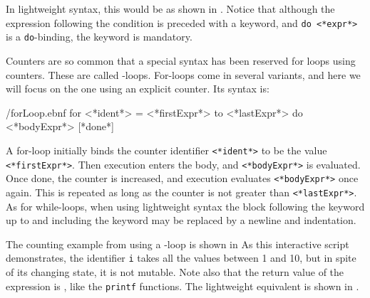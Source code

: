 In lightweight syntax, this would be as shown in .
%
%
Notice that although the expression following the condition is preceded with a  keyword, and \lstinline[language=syntax]{do <*expr*>} is a \lstinline{do}-binding, the keyword  is mandatory. 

Counters are so common that a special syntax has been reserved for loops using counters. These are called -loops. For-loops come in several variants, and here we will focus on the one using an explicit counter. Its syntax is:
%
\begin{verbatimwrite}{\ebnf/forLoop.ebnf}
for <*ident*> = <*firstExpr*> to <*lastExpr*> do <*bodyExpr*> [*done*]
\end{verbatimwrite}
%
A for-loop initially binds the counter identifier \lstinline[language=syntax]{<*ident*>} to be the value \lstinline[language=syntax]{<*firstExpr*>}. Then execution enters the body, and \lstinline[language=syntax]{<*bodyExpr*>} is evaluated. Once done, the counter is increased, and execution evaluates \lstinline[language=syntax]{<*bodyExpr*>}  once again. This is repeated as long as the counter is not greater than \lstinline[language=syntax]{<*lastExpr*>}. As for while-loops, when using lightweight syntax the block following the  keyword up to and including the  keyword may be replaced by a newline and indentation.

The counting example from  using a -loop is shown in 
%
%
As this interactive script demonstrates, the identifier \lstinline!i! takes all the values between 1 and 10, but in spite of its changing state, it is not mutable. Note also that the return value of the  expression is \lexeme{()}, like the \lstinline!printf! functions. The lightweight equivalent is shown in .
%
%

